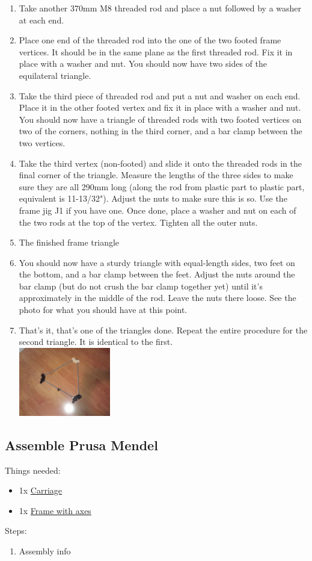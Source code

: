 \documentclass[11pt]{article}
\begin{document}
\begin{enumerate}
\item Take another 370mm M8 threaded rod and place a nut followed by a washer at each end.
\item Place one end of the threaded rod into the one of the two footed frame vertices. It should be in the same plane as the first threaded rod. Fix it in place with a washer and nut. You should now have two sides of the equilateral triangle.
\item Take the third piece of threaded rod and put a nut and washer on each end. Place it in the other footed vertex and fix it in place with a washer and nut. You should now have a triangle of threaded rods with two footed vertices on two of the corners, nothing in the third corner, and a bar clamp between the two vertices.
\item Take the third vertex (non-footed) and slide it onto the threaded rods in the final corner of the triangle. Measure the lengths of the three sides to make sure they are all 290mm long (along the rod from plastic part to plastic part, equivalent is 11-13/32"). Adjust the nuts to make sure this is so. Use the frame jig J1 if you have one. Once done, place a washer and nut on each of the two rods at the top of the vertex. Tighten all the outer nuts.
\item The finished frame triangle
\item You should now have a sturdy triangle with equal-length sides, two feet on the bottom, and a bar clamp between the feet. Adjust the nuts around the bar clamp (but do not crush the bar clamp together yet) until it's approximately in the middle of the rod. Leave the nuts there loose. See the photo for what you should have at this point.
\item That's it, that's one of the triangles done. Repeat the entire procedure for the second triangle. It is identical to the first.\\ \includegraphics[width=4cm]{images/frame/finished-triangle.jpg}
\end{enumerate}

\subsection{Assemble Prusa Mendel}
Things needed:
\begin{itemize}
\item 1x \hyperlink{thing_carriage}{Carriage}
\item 1x \hyperlink{thing_frame-with-axes}{Frame with axes}
\end{itemize}
Steps:
\begin{enumerate}
\item Assembly info
\end{enumerate}

\newpage
\end{document}
